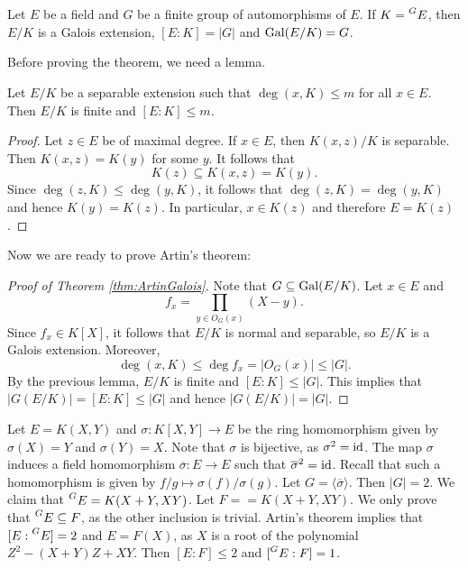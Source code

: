 \chapter{}



\begin{theorem}[Artin]
\label{thm:ArtinGalois}
    Let $E$ be a field and $G$ be a finite group of automorphisms of $E$. 
    If $K=\prescript{G}{}{E}$, then $E/K$ is a Galois extension,
    $[E:K]=|G|$ and $\operatorname{Gal}(E/K)=G$. 
\end{theorem}

Before proving the theorem, we need a lemma.

\begin{lemma}
    Let $E/K$ be a separable extension such that $\deg(x,K)\leq m$
    for all $x\in E$. Then $E/K$ is finite and $[E:K]\leq m$. 
\end{lemma}

\begin{proof}
   Let $z\in E$ be of maximal degree. If $x\in E$, 
   then $K(x,z)/K$ is separable. Then $K(x,z)=K(y)$ for some $y$. 
   It follows that 
   \[
   K(z)\subseteq K(x,z)=K(y).
   \]
   Since 
   $\deg(z,K)\leq\deg(y,K)$, it follows that
   $\deg(z,K)=\deg(y,K)$ and hence 
   $K(y)=K(z)$. In particular, $x\in K(z)$ and
   therefore $E=K(z)$. 
\end{proof}

Now we are ready to prove Artin's theorem: 

\begin{proof}[Proof of Theorem \ref{thm:ArtinGalois}]
    Note that $G\subseteq\operatorname{Gal}(E/K)$. Let $x\in E$ and 
    \[
    f_x=\prod_{y\in O_G(x)}(X-y).
    \]
    Since $f_x\in K[X]$, it follows
    that $E/K$ is normal and separable, so $E/K$ is a Galois extension. Moreover, 
    \[
    \deg(x,K)\leq \deg f_x=|O_G(x)|\leq |G|.
    \]
    By the previous lemma, $E/K$ is finite and $[E:K]\leq |G|$. This
    implies that
    $|G(E/K)|=[E:K]\leq |G|$ and hence $|G(E/K)|=|G|$. 
\end{proof}

\begin{example}
    Let $E=K(X,Y)$ and $\sigma\colon K[X,Y]\to E$ be the ring homomorphism given by $\sigma(X)=Y$ and $\sigma(Y)=X$. Note that $\sigma$ is bijective, as $\sigma^2=\operatorname{id}$. The map $\sigma$ induces
    a field homomorphism $\overline{\sigma}\colon E\to E$ such that 
    $\overline{\sigma}^2=\operatorname{id}$. Recall that such a homomorphism is given by 
    $f/g\mapsto \sigma(f)/\sigma(g)$. Let $G=\langle\overline{\sigma}\rangle$. Then $|G|=2$. 
    We claim that $\prescript{G}{}{E}=K(X+Y,XY)$. Let $F==K(X+Y,XY)$. We only prove
    that $\prescript{G}{}{E}\subseteq F$, as the other inclusion is trivial. Artin's theorem
    implies that $[E:\prescript{G}{}{E}]=2$ and $E=F(X)$, as $X$ is a root
    of the polynomial $Z^2-(X+Y)Z+XY$. Then $[E:F]\leq 2$ and $[\prescript{G}{}{E}:F]=1$.
\end{example}

